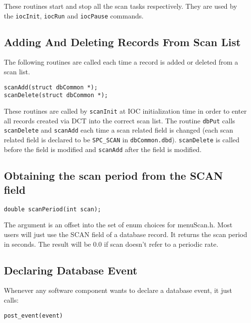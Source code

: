 These routines start and stop all the scan tasks respectively. They are used by the \verb|iocInit|, \verb|iocRun| and \verb|iocPause| 
commands.

\subsection{Adding And Deleting Records From Scan List}

The following routines are called each time a record is added or deleted from a scan list.

\begin{verbatim}
scanAdd(struct dbCommon *);
scanDelete(struct dbCommon *);
\end{verbatim}

These routines are called by \verb|scanInit| at IOC initialization time in order to enter all records created via DCT into the 
correct scan list. The routine \verb|dbPut| calls \verb|scanDelete| and \verb|scanAdd| each time a scan related field is changed (each 
scan related field is declared to be \verb|SPC_SCAN| in  \verb|dbCommon.dbd|). \verb|scanDelete| is called before the field is modified 
and \verb|scanAdd| after the field is modified.

\subsection{Obtaining the scan period from the SCAN field}

\begin{verbatim}
double scanPeriod(int scan);
\end{verbatim}

The argument is an offset into the set of enum choices for menuScan.h. Most users will just use the SCAN field of a 
database record. It returns the scan period in seconds. The result will be 0.0 if  scan doesn't refer to a periodic rate.

\subsection{Declaring Database Event}

Whenever any software component wants to declare a database event, it just calls:

\begin{verbatim}
post_event(event)
\end{verbatim}

